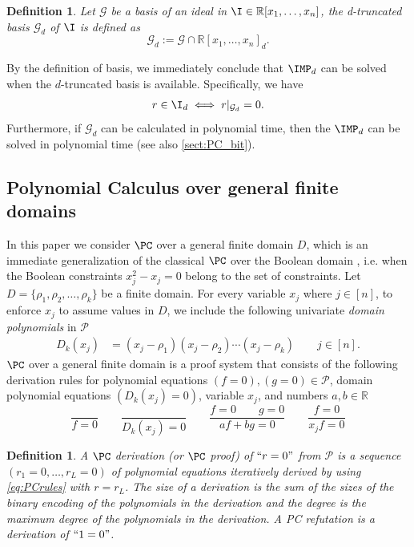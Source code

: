 \documentclass[11pt]{article}
\newtheorem{definition}[theorem]{Definition}
\begin{document}
\begin{definition}\label{def:dTruncated GB}
  Let $\mathcal{G}$ be a \GB basis of an ideal in $\I \in \mathbb{R}[x_1,\dots,x_n]$, the \emph{d-truncated \GB basis} $\mathcal{G}_d$ of $\I$ is defined as
  \begin{equation}\label{eq:Gd}
      \mathcal{G}_d := \mathcal{G} \cap \mathbb{R}[x_1,\dots,x_n]_d.
  \end{equation}
\end{definition}

By the definition of \GB basis, we immediately conclude that $\IMP_d$ can be solved when the $d$-truncated \GB basis is available. Specifically, we have
\begin{align*}
    r \in \I_d \iff r|_{\mathcal{G}_d} = 0.
\end{align*}
Furthermore, if $\mathcal{G}_d$ can be calculated in polynomial time, then the $\IMP_d$ can be solved in polynomial time (see also \cref{sect:PC_bit}).

\subsection*{Polynomial Calculus over general finite domains}

In this paper we consider $\PC$ over a general finite domain $D$, which is an immediate generalization of the classical $\PC$ over the Boolean domain \cite{CleggEI96}, i.e. when the Boolean constraints $x_j^2 - x_j = 0$ belong to the set of constraints. Let $D = \{\rho_1, \rho_2, \ldots, \rho_k\}$ be a finite domain. For every variable $x_j$ where $j \in [n]$, to enforce $x_j$ to assume values in $D$, we include the following univariate \emph{domain polynomials} in $\mathcal{P}$
\begin{align*}
    D_{k}(x_j)&=(x_j-\rho_{1})(x_j-\rho_{2})\cdots (x_j-\rho_{k}) \qquad j \in [n].
\end{align*}
$\PC$ over a general finite domain is a proof system that consists of the following derivation rules for polynomial equations $(f = 0), (g = 0) \in  \mathcal{P}$, domain polynomial equations $(D_{k}(x_j)=0)$, variable $x_j$, and numbers $a, b \in \mathbb{R}$
\begin{equation}\label{eq:PCrules}
    \frac{}{f=0} \qquad \frac{}{D_{k}(x_j)=0} \qquad \frac{f=0 \qquad g=0}{a f + b g =0} \qquad \frac{f=0}{x_jf=0} 
\end{equation}

\begin{definition}\label{def:pc_derivation}
    A \emph{$\PC$ derivation} (or \emph{$\PC$ proof}) of $``r=0"$ from $\mathcal{P}$ is a sequence $(r_1=0,\ldots,r_L=0)$ of polynomial equations iteratively derived by using \eqref{eq:PCrules} with $r=r_L$. The \emph{size} of a derivation is the sum of the sizes of the binary encoding of the polynomials in the derivation and the \emph{degree} is the maximum degree of the polynomials in the derivation. A \emph{PC refutation} is a derivation of $``1=0"$.
\end{definition}
\end{document}
